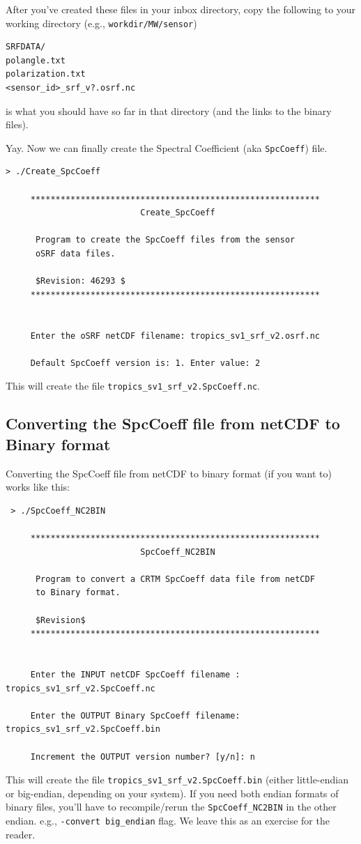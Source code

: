 After you've created these files in your inbox directory, copy the following to your working directory (e.g., \verb|workdir/MW/sensor|)
\begin{verbatim}
SRFDATA/
polangle.txt
polarization.txt
<sensor_id>_srf_v?.osrf.nc
\end{verbatim}

is what you should have so far in that directory (and the links to the binary files).

Yay.  Now we can finally create the Spectral Coefficient (aka \verb|SpcCoeff|) file.   
\begin{verbatim}
> ./Create_SpcCoeff 

     **********************************************************
                           Create_SpcCoeff

      Program to create the SpcCoeff files from the sensor 
      oSRF data files.

      $Revision: 46293 $
     **********************************************************


     Enter the oSRF netCDF filename: tropics_sv1_srf_v2.osrf.nc

     Default SpcCoeff version is: 1. Enter value: 2

\end{verbatim}
This will create the file \verb|tropics_sv1_srf_v2.SpcCoeff.nc|.

\subsection{Converting the SpcCoeff file from netCDF to Binary format}
Converting the SpcCoeff file from netCDF to binary format (if you want to) works like this:
\begin{verbatim}
 > ./SpcCoeff_NC2BIN 

     **********************************************************
                           SpcCoeff_NC2BIN

      Program to convert a CRTM SpcCoeff data file from netCDF 
      to Binary format.

      $Revision$
     **********************************************************


     Enter the INPUT netCDF SpcCoeff filename : tropics_sv1_srf_v2.SpcCoeff.nc

     Enter the OUTPUT Binary SpcCoeff filename: tropics_sv1_srf_v2.SpcCoeff.bin

     Increment the OUTPUT version number? [y/n]: n
\end{verbatim}
This will create the file \verb|tropics_sv1_srf_v2.SpcCoeff.bin| (either little-endian or big-endian, depending on your system).
If you need both endian formats of binary files, you'll have to recompile/rerun the \verb|SpcCoeff_NC2BIN| in the other endian.  e.g., \verb|-convert big_endian| flag.   We leave this as an exercise for the reader.

